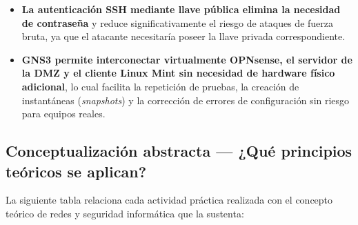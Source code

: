 \documentclass{article}
\renewcommand{\_}{\oldunderscore\hskip0pt\relax}
\begin{document}
\begin{itemize}
  dirección IP del atacante tras superar el número de intentos
  configurado.
\item
  \textbf{La autenticación SSH mediante llave pública elimina la
  necesidad de contraseña} y reduce significativamente el riesgo de
  ataques de fuerza bruta, ya que el atacante necesitaría poseer la
  llave privada correspondiente.
\item
  \textbf{GNS3 permite interconectar virtualmente OPNsense, el servidor
  de la DMZ y el cliente Linux Mint sin necesidad de hardware físico
  adicional}, lo cual facilita la repetición de pruebas, la creación de
  instantáneas (\emph{snapshots}) y la corrección de errores de
  configuración sin riesgo para equipos reales.
\end{itemize}

\hypertarget{conceptualizaciuxf3n-abstracta-quuxe9-principios-teuxf3ricos-se-aplican}{%
\subsection{Conceptualización abstracta --- ¿Qué principios teóricos se
aplican?}\label{conceptualizaciuxf3n-abstracta-quuxe9-principios-teuxf3ricos-se-aplican}}

La siguiente tabla relaciona cada actividad práctica realizada con el
concepto teórico de redes y seguridad informática que la sustenta:
\end{document}
